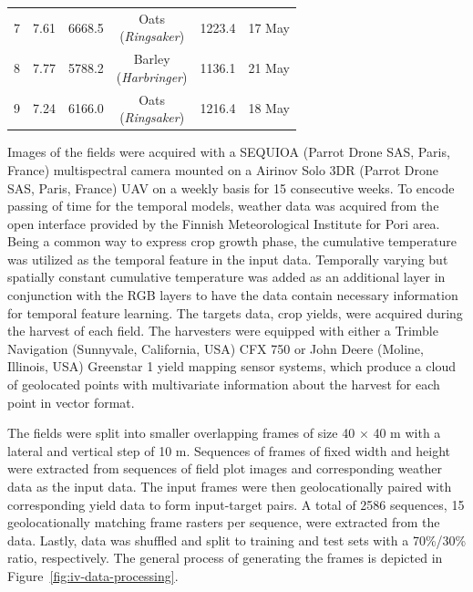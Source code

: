 \begin{table}[ht]
\begin{tabular}{@{}cccccc@{}}
    7                             & 7.61                             & 6668.5                                    & \makecell{Oats\\(\textit{Ringsaker})}        & 1223.4                            & 17 May                           \\
    8                             & 7.77                             & 5788.2                                    & \makecell{Barley\\(\textit{Harbringer})}     & 1136.1                            & 21 May                           \\
    9                             & 7.24                             & 6166.0                                    & \makecell{Oats\\(\textit{Ringsaker})}        & 1216.4                            & 18 May                           \\ \bottomrule
    \end{tabular}
\end{table}

Images of the fields were acquired with a SEQUIOA (Parrot Drone SAS, Paris, France) multispectral camera mounted on a Airinov Solo 3DR (Parrot Drone SAS, Paris, France) UAV on a weekly basis for 15 consecutive weeks. To encode passing of time for the temporal models, weather data was acquired from the open interface provided by the Finnish Meteorological Institute for Pori area. Being a common way to express crop growth phase, the cumulative temperature was utilized as the temporal feature in the input data. Temporally varying but spatially constant cumulative temperature was added as an additional layer in conjunction with the RGB layers to have the data contain necessary information for temporal feature learning. The targets data, crop yields, were acquired during the harvest of each field. The harvesters were equipped with either a Trimble Navigation (Sunnyvale, California, USA) CFX 750 or John Deere (Moline, Illinois, USA) Greenstar 1 yield mapping sensor systems, which produce a cloud of geolocated points with multivariate information about the harvest for each point in vector format.

The fields were split into smaller overlapping frames of size 40 $\times$ 40 m with a lateral and vertical step of 10 m. Sequences of frames of fixed width and height were extracted from sequences of field plot images and corresponding weather data as the input data. The input frames were then geolocationally paired with corresponding yield data to form input-target pairs. A total of 2586 sequences, 15 geolocationally matching frame rasters per sequence, were extracted from the data. Lastly, data was shuffled and split to training and test sets with a 70\%/30\% ratio, respectively. The general process of generating the frames is depicted in Figure~\ref{fig:iv-data-processing}.

